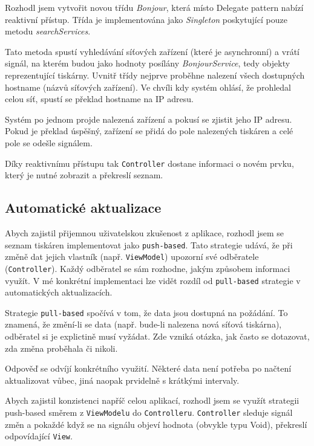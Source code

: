 Rozhodl jsem vytvořit novou třídu \textit{Bonjour}, která místo Delegate pattern nabízí reaktivní přístup.
Třída je implementována jako \textit{Singleton} \cite{thatthinginswift-singletons} poskytující pouze metodu \textit{searchServices}.

Tato metoda spustí vyhledávání síťových zařízení (které je asynchronní) a vrátí signál, na kterém budou jako hodnoty posílány \textit{BonjourService}, tedy objekty reprezentující tiskárny.
Uvnitř třídy nejprve proběhne nalezení všech dostupných hostname (názvů síťových zařízení).
Ve chvíli kdy systém ohlásí, že prohledal celou síť, spustí se překlad hostname na IP adresu.

Systém po jednom projde nalezená zařízení a pokusí se zjistit jeho IP adresu.
Pokud je překlad úspěšný, zařízení se přidá do pole nalezených tiskáren a celé pole se odešle signálem.

Díky reaktivnímu přístupu tak \texttt{Controller} dostane informaci o novém prvku, který je nutné zobrazit a překreslí seznam.

\subsection{Automatické aktualizace}

Abych zajistil přijemnou uživatelskou zkušenost z aplikace, rozhodl jsem se seznam tiskáren implementovat jako \texttt{push-based}.
Tato strategie udává, že při změně dat jejich vlastník (např. \texttt{ViewModel}) upozorní své odběratele (\texttt{Controller}).
Každý odběratel se sám rozhodne, jakým způsobem informaci využít.
V mé konkrétní implementaci lze vidět rozdíl od \texttt{pull-based} strategie v automatických aktualizacích.

Strategie \texttt{pull-based} spočívá v tom, že data jsou dostupná na požádání.
To znamená, že změní-li se data (např. bude-li nalezena nová síťová tiskárna), odběratel si je explictině musí vyžádat.
Zde vzniká otázka, jak často se dotazovat, zda změna proběhala či nikoli.

Odpověď se odvíjí konkrétního využití.
Některé data není potřeba po načtení aktualizovat vůbec, jiná naopak prvidelně s krátkými intervaly.

\bigskip

Abych zajistil konzistenci napříč celou aplikací, rozhodl jsem se využít strategii push-based směrem z \texttt{ViewModelu} do \texttt{Controlleru}.
\texttt{Controller} sleduje signál změn a pokaždé když se na signálu objeví hodnota (obvykle typu Void), překreslí odpovídající \texttt{View}.

